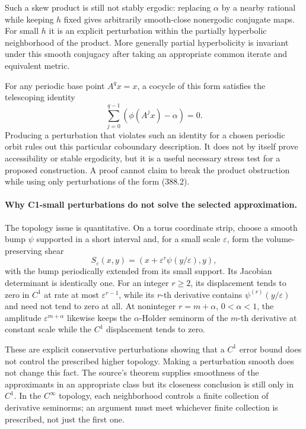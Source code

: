 \documentclass[11pt]{article}
\begin{document}
Such a skew product is still not stably ergodic: replacing
$\alpha$ by a nearby rational while keeping $h$ fixed gives
arbitrarily smooth-close nonergodic conjugate maps. For small $h$
it is an explicit perturbation within the partially hyperbolic
neighborhood of the product. More generally partial hyperbolicity
is invariant under this smooth conjugacy after taking an appropriate
common iterate and equivalent metric.

For any periodic base point $A^q x=x$, a cocycle of this form
satisfies the telescoping identity
\[
 \sum_{j=0}^{q-1}(\phi(A^jx)-\alpha)=0.
 \tag{388.3}
\]
Producing a perturbation that violates such an identity for a
chosen periodic orbit rules out this particular coboundary
description. It does not by itself prove accessibility or stable
ergodicity, but it is a useful necessary stress test for a
proposed construction. A proof cannot claim to break the product
obstruction while using only perturbations of the form (388.2).

\paragraph{Why C1-small perturbations do not solve the selected approximation.}
The topology issue is quantitative. On a torus coordinate strip,
choose a smooth bump $\psi$ supported in a short interval and,
for a small scale $\varepsilon$, form the volume-preserving shear
\[
 S_\varepsilon(x,y)=(x+\varepsilon^r\psi(y/\varepsilon),y),
 \tag{388.4}
\]
with the bump periodically extended from its small support. Its
Jacobian determinant is identically one. For an integer $r\geq2$,
its displacement tends to zero in $C^1$ at rate at most
$\varepsilon^{r-1}$, while its $r$-th derivative contains
$\psi^{(r)}(y/\varepsilon)$ and need not tend to zero at all.
At noninteger $r=m+\alpha$, $0<\alpha<1$, the amplitude
$\varepsilon^{m+\alpha}$ likewise keeps the $\alpha$-Holder
seminorm of the $m$-th derivative at constant scale while the
$C^1$ displacement tends to zero.

These are explicit conservative perturbations showing that a
$C^1$ error bound does not control the prescribed higher topology.
Making a perturbation smooth does not change this fact. The source's
theorem supplies smoothness of the approximants in an appropriate
class but its closeness conclusion is still only in $C^1$.
In the $C^\infty$ topology, each neighborhood controls a finite
collection of derivative seminorms; an argument must meet whichever
finite collection is prescribed, not just the first one.
\end{document}
